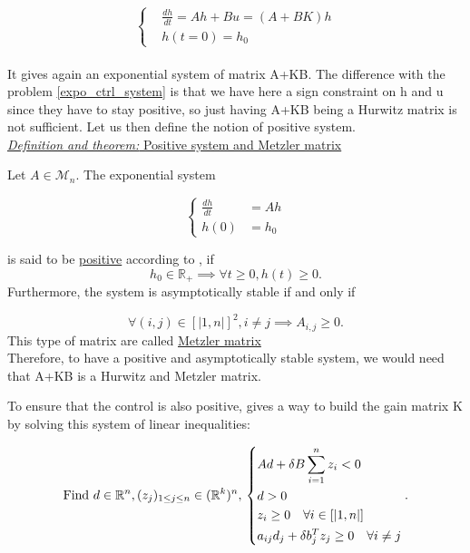 \documentclass[12pt]{article}
\begin{document}
\begin{equation}\label{pos_ctrl_system}
\left\{
\begin{aligned}
    &\frac{dh}{dt} = Ah+Bu = (A+BK)h\\
    &h(t=0) = h_0
\end{aligned}
\right. 
\end{equation}
\\

It gives again an exponential system of matrix A+KB. The difference with the problem \eqref{expo_ctrl_system} is that we have here a sign constraint on h and u since they have to stay positive, so just having A+KB being a Hurwitz matrix is not sufficient. Let us then define the notion of positive system.
\\

\underline{\textit{Definition and theorem:} Positive system and Metzler matrix}

Let $A \in \mathcal{M}_n.$ The exponential system 

\begin{equation}
\left\{
\begin{aligned}
\frac{dh}{dt}&= Ah\\
h(0) &= h_0 
\end{aligned}
\right.
\end{equation}

is said to be \underline{positive} according to \cite{pos_ctrl_paper}, if 
\begin{equation}
    h_0 \in \mathbb{R}_+ \implies \forall t \geq 0, h(t) \geq 0.
\end{equation}
Furthermore, the system is asymptotically stable if and only if 

\begin{equation*}
    \forall (i,j) \in [|1,n|]^2, i\neq j \implies A_{i,j} \geq 0.
\end{equation*}
This type of matrix are called \underline{Metzler matrix}
\\

Therefore, to have a positive and asymptotically stable system, we would need that A+KB is a Hurwitz and Metzler matrix. 

To ensure that the control is also positive, \cite{pos_ctrl_paper} gives a way to build the gain matrix K by solving this system of linear inequalities: 


\begin{equation}\label{linear_inequalities_pos_ctrl}
\text{Find } d\in \mathbb{R}^n,(z_j)_{1\leq j \leq n}\in (\mathbb{R}^k)^n, \quad \\
    \left\{ 
\begin{aligned}
&Ad+\delta B\sum_{i=1}^n z_i <0 \\
&d>0\\
&z_i \geq 0 \quad \forall i \in  [|1,n|]\\
&a_{ij}d_j + \delta b_j^Tz_j\geq 0 \quad \forall i\neq j 
\end{aligned}
\right. .
\end{equation}
\end{document}
